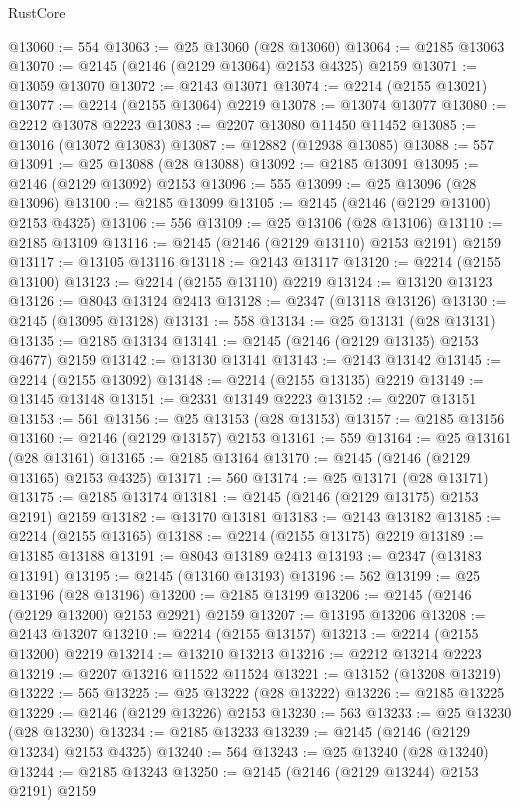 \begin{lexlean}{RustCore}
\begin{coremodule}
@13060 := 554
@13063 := @25 @13060 (@28 @13060)
@13064 := @2185 @13063
@13070 := @2145 (@2146 (@2129 @13064) @2153 @4325) @2159
@13071 := @13059 @13070
@13072 := @2143 @13071
@13074 := @2214 (@2155 @13021)
@13077 := @2214 (@2155 @13064) @2219
@13078 := @13074 @13077
@13080 := @2212 @13078 @2223
@13083 := @2207 @13080 @11450 @11452
@13085 := @13016 (@13072 @13083)
@13087 := @12882 (@12938 @13085)
@13088 := 557
@13091 := @25 @13088 (@28 @13088)
@13092 := @2185 @13091
@13095 := @2146 (@2129 @13092) @2153
@13096 := 555
@13099 := @25 @13096 (@28 @13096)
@13100 := @2185 @13099
@13105 := @2145 (@2146 (@2129 @13100) @2153 @4325)
@13106 := 556
@13109 := @25 @13106 (@28 @13106)
@13110 := @2185 @13109
@13116 := @2145 (@2146 (@2129 @13110) @2153 @2191) @2159
@13117 := @13105 @13116
@13118 := @2143 @13117
@13120 := @2214 (@2155 @13100)
@13123 := @2214 (@2155 @13110) @2219
@13124 := @13120 @13123
@13126 := @8043 @13124 @2413
@13128 := @2347 (@13118 @13126)
@13130 := @2145 (@13095 @13128)
@13131 := 558
@13134 := @25 @13131 (@28 @13131)
@13135 := @2185 @13134
@13141 := @2145 (@2146 (@2129 @13135) @2153 @4677) @2159
@13142 := @13130 @13141
@13143 := @2143 @13142
@13145 := @2214 (@2155 @13092)
@13148 := @2214 (@2155 @13135) @2219
@13149 := @13145 @13148
@13151 := @2331 @13149 @2223
@13152 := @2207 @13151
@13153 := 561
@13156 := @25 @13153 (@28 @13153)
@13157 := @2185 @13156
@13160 := @2146 (@2129 @13157) @2153
@13161 := 559
@13164 := @25 @13161 (@28 @13161)
@13165 := @2185 @13164
@13170 := @2145 (@2146 (@2129 @13165) @2153 @4325)
@13171 := 560
@13174 := @25 @13171 (@28 @13171)
@13175 := @2185 @13174
@13181 := @2145 (@2146 (@2129 @13175) @2153 @2191) @2159
@13182 := @13170 @13181
@13183 := @2143 @13182
@13185 := @2214 (@2155 @13165)
@13188 := @2214 (@2155 @13175) @2219
@13189 := @13185 @13188
@13191 := @8043 @13189 @2413
@13193 := @2347 (@13183 @13191)
@13195 := @2145 (@13160 @13193)
@13196 := 562
@13199 := @25 @13196 (@28 @13196)
@13200 := @2185 @13199
@13206 := @2145 (@2146 (@2129 @13200) @2153 @2921) @2159
@13207 := @13195 @13206
@13208 := @2143 @13207
@13210 := @2214 (@2155 @13157)
@13213 := @2214 (@2155 @13200) @2219
@13214 := @13210 @13213
@13216 := @2212 @13214 @2223
@13219 := @2207 @13216 @11522 @11524
@13221 := @13152 (@13208 @13219)
@13222 := 565
@13225 := @25 @13222 (@28 @13222)
@13226 := @2185 @13225
@13229 := @2146 (@2129 @13226) @2153
@13230 := 563
@13233 := @25 @13230 (@28 @13230)
@13234 := @2185 @13233
@13239 := @2145 (@2146 (@2129 @13234) @2153 @4325)
@13240 := 564
@13243 := @25 @13240 (@28 @13240)
@13244 := @2185 @13243
@13250 := @2145 (@2146 (@2129 @13244) @2153 @2191) @2159

\end{coremodule}
\end{lexlean}
